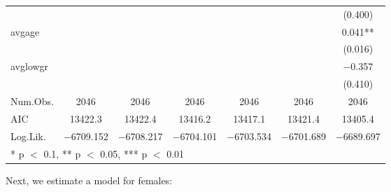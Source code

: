 \documentclass[
]{article}
\begin{document}
\begin{table}[!h]
{\begin{tabular}[t]{lcccccc}
 &  &  &  &  &  & (\num{0.400})\\
avgage &  &  &  &  &  & \num{0.041}**\\
 &  &  &  &  &  & (\num{0.016})\\
avglowgr &  &  &  &  &  & \num{-0.357}\\
 &  &  &  &  &  & (\num{0.410})\\
\midrule
Num.Obs. & \num{2046} & \num{2046} & \num{2046} & \num{2046} & \num{2046} & \num{2046}\\
AIC & \num{13422.3} & \num{13422.4} & \num{13416.2} & \num{13417.1} & \num{13421.4} & \num{13405.4}\\
Log.Lik. & \num{-6709.152} & \num{-6708.217} & \num{-6704.101} & \num{-6703.534} & \num{-6701.689} & \num{-6689.697}\\
\bottomrule
\multicolumn{7}{l}{\rule{0pt}{1em}* p $<$ 0.1, ** p $<$ 0.05, *** p $<$ 0.01}\\
\end{tabular}}
\end{table}

\clearpage

Next, we estimate a model for females:
\end{document}
